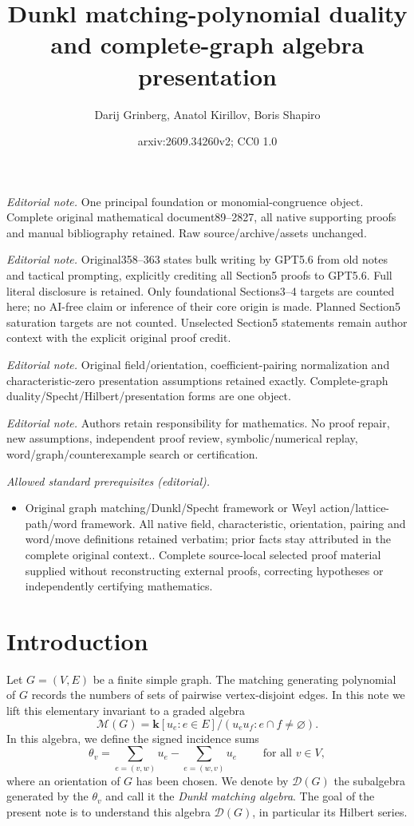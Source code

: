 \documentclass[12pt]{amsart}
\title{Dunkl matching-polynomial duality and complete-graph algebra presentation}
\author{Darij Grinberg, Anatol Kirillov, Boris Shapiro}
\date{arxiv:2609.34260v2; CC0 1.0}
\theoremstyle{definition}
\theoremstyle{remark}
\newcommand{\kk}{\mathbf{k}}
\begin{document}
\maketitle
\noindent\textit{Editorial note.} One principal foundation or monomial-congruence object. Complete original mathematical document89--2827, all native supporting proofs and manual bibliography retained. Raw source/archive/assets unchanged.\par\medskip
\noindent\textit{Editorial note.} Original358--363 states bulk writing by GPT5.6 from old notes and tactical prompting, explicitly crediting all Section5 proofs to GPT5.6. Full literal disclosure is retained. Only foundational Sections3--4 targets are counted here; no AI-free claim or inference of their core origin is made. Planned Section5 saturation targets are not counted. Unselected Section5 statements remain author context with the explicit original proof credit.\par\medskip
\noindent\textit{Editorial note.} Original field/orientation, coefficient-pairing normalization and characteristic-zero presentation assumptions retained exactly. Complete-graph duality/Specht/Hilbert/presentation forms are one object.\par\medskip
\noindent\textit{Editorial note.} Authors retain responsibility for mathematics. No proof repair, new assumptions, independent proof review, symbolic/numerical replay, word/graph/counterexample search or certification.\par\medskip
\noindent\textit{Allowed standard prerequisites (editorial).}\begin{itemize}
\item Original graph matching/Dunkl/Specht framework or Weyl action/lattice-path/word framework. All native field, characteristic, orientation, pairing and word/move definitions retained verbatim; prior facts stay attributed in the complete original context.. Complete source-local selected proof material supplied without reconstructing external proofs, correcting hypotheses or independently certifying mathematics.
\end{itemize}\medskip
\section{Introduction}


Let $G=(V,E)$ be a finite simple graph.  The matching generating polynomial
of $G$ records the numbers of sets of pairwise vertex-disjoint edges.  In this
note we lift this elementary invariant to a graded algebra
\[
  \mathcal M(G)=\kk[u_e:e\in E]/(u_eu_f:e\cap f\ne\varnothing).
\]
In this algebra, we define the signed incidence sums
\[
  \theta_v=\sum_{e=(v,w)}u_e-\sum_{e=(w,v)}u_e
  \qquad \text{ for all } v \in V,
\]
where an orientation of $G$ has been chosen.  We denote by $\mathcal D(G)$
the subalgebra generated by the $\theta_v$ and call it the \emph{Dunkl
matching algebra}.
The goal of the present note is to understand this algebra
$\mathcal D(G)$, in particular its Hilbert series.
\end{document}
